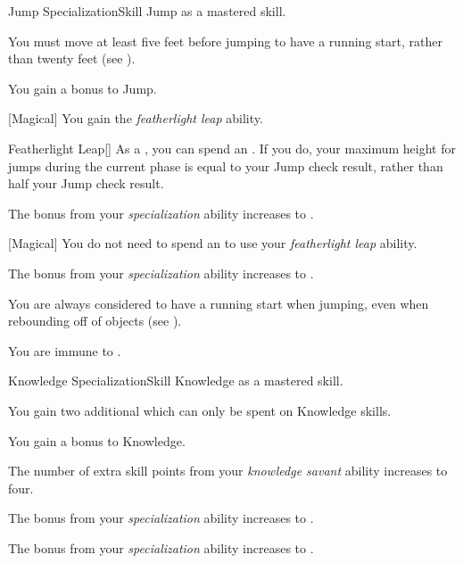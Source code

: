    \begin{feat}{Jump Specialization}{Skill}
        \featpre Jump as a mastered skill.

         You must move at least five feet before jumping to have a running start, rather than twenty feet (see ).

         You gain a  bonus to Jump.

        [Magical] You gain the \textit{featherlight leap} ability.
        \begin{ability}{Featherlight Leap}[]
            As a , you can spend an .
            If you do, your maximum height for jumps during the current phase is equal to your Jump check result, rather than half your Jump check result.
        \end{ability}

         The bonus from your \textit{specialization} ability increases to .

        [Magical] You do not need to spend an  to use your \textit{featherlight leap} ability.

         The bonus from your \textit{specialization} ability increases to .

         You are always considered to have a running start when jumping, even when rebounding off of objects (see ).

         You are immune to .
    \end{feat}

    \begin{feat}{Knowledge Specialization}{Skill}
        \featpre Knowledge as a mastered skill.

         You gain two additional  which can only be spent on Knowledge skills.

         You gain a  bonus to Knowledge.

         The number of extra skill points from your \textit{knowledge savant} ability increases to four.

         The bonus from your \textit{specialization} ability increases to .

         The bonus from your \textit{specialization} ability increases to .
    \end{feat}

